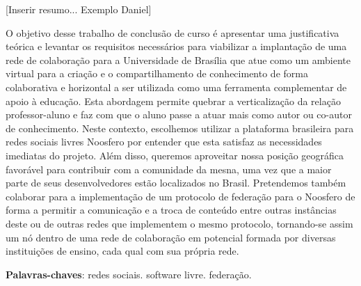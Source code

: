 \begin{resumo}

[Inserir resumo... Exemplo Daniel]

O objetivo desse trabalho de conclusão de curso é apresentar uma justificativa
teórica e levantar os requisitos necessários para viabilizar a implantação
de uma rede de colaboração para a Universidade de Brasília que atue como um
ambiente virtual para a criação e o compartilhamento de conhecimento de forma
colaborativa e horizontal a ser utilizada como uma ferramenta complementar de
apoio à educação.  
%
Esta abordagem permite quebrar a verticalização da relação professor-aluno e
faz com que o aluno passe a atuar mais como autor ou co-autor de conhecimento. 
%
Neste contexto, escolhemos utilizar a plataforma
brasileira para redes sociais livres Noosfero por entender que esta satisfaz as
necessidades imediatas do projeto. Além disso, queremos aproveitar nossa
posição geográfica favorável para contribuir com a comunidade da mesna, uma vez
que a maior parte de seus desenvolvedores estão localizados no Brasil.
%
Pretendemos também colaborar para a implementação de um protocolo de federação
para o Noosfero de forma a permitir a comunicação e a troca de conteúdo entre
outras instâncias deste ou de outras redes que implementem o mesmo protocolo,
tornando-se assim um nó dentro de uma rede de colaboração em potencial 
formada por diversas instituições de ensino, cada qual com sua própria rede.

 \vspace{\onelineskip}
    
 \noindent
 \textbf{Palavras-chaves}: redes sociais. software livre. federação.
\end{resumo}
